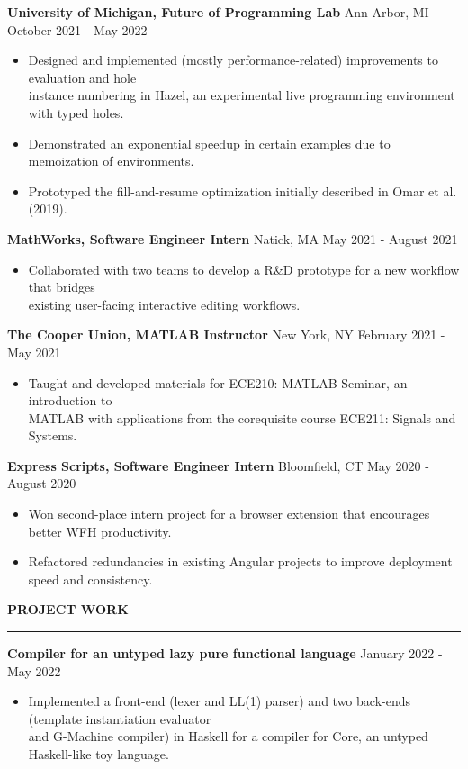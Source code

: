 \documentclass[]{article}
\newcommand{\br}{\vspace{10pt}}
\newcommand{\brs}{\vspace{3pt}}
\newcommand{\hr}{\vspace{4pt}\hrule\vspace{4pt}}
\begin{document}
\brs

\textbf{University of Michigan, Future of Programming Lab}
Ann Arbor, MI
\hfill
October 2021 - May 2022
\begin{itemize}
\item Designed and implemented (mostly performance-related) improvements to evaluation and hole \\
  instance numbering in Hazel, an experimental live programming environment with typed holes.
\item Demonstrated an exponential speedup in certain examples due to memoization of environments.
\item Prototyped the fill-and-resume optimization initially described in Omar et al. (2019).
\end{itemize}

\brs

\textbf{MathWorks, Software Engineer Intern}
Natick, MA
\hfill
May 2021 - August 2021
\begin{itemize}
\item Collaborated with two teams to develop a R\&D prototype for a new workflow that bridges\\
  existing user-facing interactive editing workflows.
\end{itemize}

\brs

\textbf{The Cooper Union, MATLAB Instructor}
New York, NY
\hfill
February 2021 - May 2021
\begin{itemize}
\item Taught and developed materials for ECE210: MATLAB Seminar, an introduction to\\
  MATLAB with applications from the corequisite course ECE211: Signals and Systems.
\end{itemize}

\brs

\textbf{Express Scripts, Software Engineer Intern}
Bloomfield, CT
\hfill
May 2020 - August 2020
\begin{itemize}
\item Won second-place intern project for a browser extension that encourages better WFH productivity.
\item Refactored redundancies in existing Angular projects to improve deployment speed and consistency.
\end{itemize}

\br

\textbf{PROJECT WORK}
\hr

\textbf{Compiler for an untyped lazy pure functional language}
\hfill
January 2022 - May 2022
\begin{itemize}
\item Implemented a front-end (lexer and LL(1) parser) and two back-ends (template instantiation evaluator \\
  and G-Machine compiler) in Haskell for a compiler for Core, an untyped Haskell-like toy language.
\end{itemize}
\end{document}
